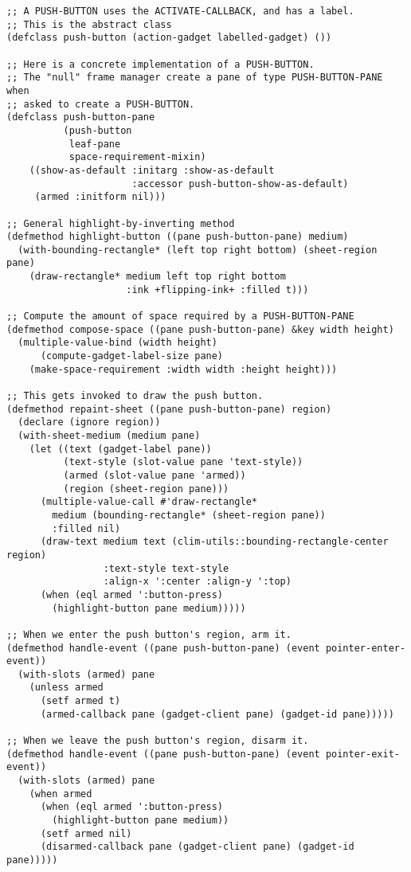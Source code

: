 \begin{verbatim}
;; A PUSH-BUTTON uses the ACTIVATE-CALLBACK, and has a label.
;; This is the abstract class
(defclass push-button (action-gadget labelled-gadget) ())

;; Here is a concrete implementation of a PUSH-BUTTON.
;; The "null" frame manager create a pane of type PUSH-BUTTON-PANE when
;; asked to create a PUSH-BUTTON.
(defclass push-button-pane
          (push-button
           leaf-pane
           space-requirement-mixin)
    ((show-as-default :initarg :show-as-default
                      :accessor push-button-show-as-default)
     (armed :initform nil)))

;; General highlight-by-inverting method
(defmethod highlight-button ((pane push-button-pane) medium)
  (with-bounding-rectangle* (left top right bottom) (sheet-region pane)
    (draw-rectangle* medium left top right bottom
                     :ink +flipping-ink+ :filled t)))

;; Compute the amount of space required by a PUSH-BUTTON-PANE
(defmethod compose-space ((pane push-button-pane) &key width height)
  (multiple-value-bind (width height)
      (compute-gadget-label-size pane)
    (make-space-requirement :width width :height height)))

;; This gets invoked to draw the push button.
(defmethod repaint-sheet ((pane push-button-pane) region)
  (declare (ignore region))
  (with-sheet-medium (medium pane)
    (let ((text (gadget-label pane))
          (text-style (slot-value pane 'text-style))
          (armed (slot-value pane 'armed))
          (region (sheet-region pane)))
      (multiple-value-call #'draw-rectangle*
        medium (bounding-rectangle* (sheet-region pane))
        :filled nil)
      (draw-text medium text (clim-utils::bounding-rectangle-center region)
                 :text-style text-style
                 :align-x ':center :align-y ':top)
      (when (eql armed ':button-press)
        (highlight-button pane medium)))))

;; When we enter the push button's region, arm it.
(defmethod handle-event ((pane push-button-pane) (event pointer-enter-event))
  (with-slots (armed) pane
    (unless armed
      (setf armed t)
      (armed-callback pane (gadget-client pane) (gadget-id pane)))))

;; When we leave the push button's region, disarm it.
(defmethod handle-event ((pane push-button-pane) (event pointer-exit-event))
  (with-slots (armed) pane
    (when armed
      (when (eql armed ':button-press)
        (highlight-button pane medium))
      (setf armed nil)
      (disarmed-callback pane (gadget-client pane) (gadget-id pane)))))


\end{verbatim}
